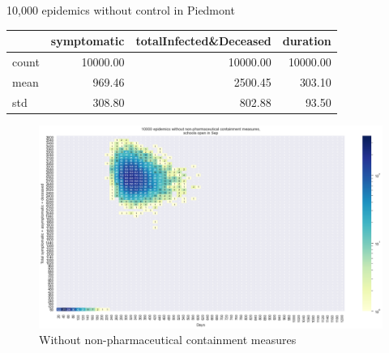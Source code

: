 \documentclass[9pt]{beamer}
\begin{document}
\begin{frame}{10,000 epidemics without control in Piedmont}


\begin{table}[H]
\center
\tiny

\begin{tabular}{lrrr}
\toprule
{} &  symptomatic &  totalInfected\&Deceased &  duration \\
\midrule
count &     10000.00 &                10000.00 &  10000.00 \\
mean  &       969.46 &                 2500.45 &    303.10 \\
std   &       308.80 &                  802.88 &     93.50 \\
\bottomrule
\end{tabular}

\label{noCTab}
\end{table}

\begin{figure}[H]
\center
\includegraphics[scale=0.22]{10kNoControl.png}
\caption{Without non-pharmaceutical containment measures} 
\label{noC}
\end{figure}

\end{frame}
\end{document}
